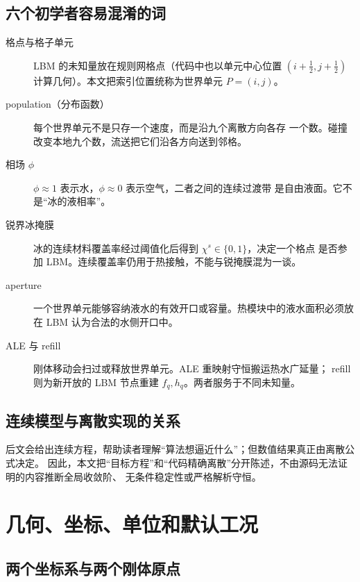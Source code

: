 \documentclass[UTF8,zihao=-4]{ctexart}
\numberwithin{equation}{section}
\begin{document}
\subsection{六个初学者容易混淆的词}

\begin{description}
  \item[格点与格子单元] LBM 的未知量放在规则网格点（代码中也以单元中心位置
  $(i+\tfrac12,j+\tfrac12)$ 计算几何）。本文把索引位置统称为世界单元 $P=(i,j)$。
  \item[population（分布函数）] 每个世界单元不是只存一个速度，而是沿九个离散方向各存
  一个数。碰撞改变本地九个数，流送把它们沿各方向送到邻格。
  \item[相场 $\phi$] $\phi\approx1$ 表示水，$\phi\approx0$ 表示空气，二者之间的连续过渡带
  是自由液面。它不是“冰的液相率”。
  \item[锐界冰掩膜] 冰的连续材料覆盖率经过阈值化后得到 $\chi^s\in\{0,1\}$，决定一个格点
  是否参加 LBM。连续覆盖率仍用于热接触，不能与锐掩膜混为一谈。
  \item[aperture] 一个世界单元能够容纳液水的有效开口或容量。热模块中的液水面积必须放在
  LBM 认为合法的水侧开口中。
  \item[ALE 与 refill] 刚体移动会扫过或释放世界单元。ALE 重映射守恒搬运热水广延量；
  refill 则为新开放的 LBM 节点重建 $f_q,h_q$。两者服务于不同未知量。
\end{description}

\subsection{连续模型与离散实现的关系}

后文会给出连续方程，帮助读者理解“算法想逼近什么”；但数值结果真正由离散公式决定。
因此，本文把“目标方程”和“代码精确离散”分开陈述，不由源码无法证明的内容推断全局收敛阶、
无条件稳定性或严格解析守恒。

\section{几何、坐标、单位和默认工况}

\subsection{两个坐标系与两个刚体原点}
\end{document}
